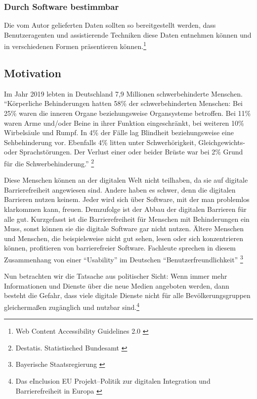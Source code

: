 \subsubsection{Durch Software bestimmbar}
Die vom Autor gelieferten Daten sollten so bereitgestellt werden, dass Benutzeragenten und assistierende Techniken diese Daten entnehmen können und in verschiedenen
Formen präsentieren können.\footnote{Web Content Accessibility Guidelines 2.0 \cite{WCAG2.0}}

\subsection{Motivation}
Im Jahr 2019 lebten in Deutschland 7,9 Millionen schwerbehinderte Menschen. "`Körperliche Behinderungen hatten 58\% der schwerbehinderten Menschen: Bei 25\% waren die inneren Organe beziehungsweise Organsysteme betroffen. Bei 11\% waren Arme und/oder Beine in ihrer Funktion eingeschränkt, bei weiteren 10\% Wirbelsäule und Rumpf. In 4\% der Fälle lag Blindheit beziehungsweise eine Sehbehinderung vor. Ebenfalls 4\% litten unter Schwerhörigkeit, Gleichgewichts- oder Sprachstörungen. Der Verlust einer oder beider Brüste war bei 2\% Grund für die Schwerbehinderung."' \footnote{Destatis. Statistisched Bundesamt \cite{DESTATIS}}

Diese Menschen können an der digitalen Welt nicht teilhaben, da sie auf digitale Barrierefreiheit angewiesen sind. Andere haben es schwer, denn die digitalen Barrieren nutzen keinem. Jeder wird sich über Software, mit der man problemlos klarkommen kann, freuen. Demzufolge ist der Abbau der digitalen Barrieren für alle gut. Kurzgefasst ist die Barrierefreiheit für Menschen mit Behinderungen ein Muss, sonst können sie die digitale Software gar nicht nutzen. Ältere Menschen und Menschen, die beispielsweise nicht gut sehen, lesen oder sich konzentrieren können, profitieren von barrierefreier Software. Fachleute sprechen in diesem Zusammenhang von einer "`Usability"' im Deutschen "`Benutzerfreundlichkeit"' \footnote{Bayerische Staatsregierung \cite{BS}}

Nun betrachten wir die Tatsache aus politischer Sicht: Wenn immer mehr Informationen und Dienste über die neue Medien angeboten werden, dann besteht die Gefahr, dass viele digitale Dienste nicht für alle Bevölkerungsgruppen gleichermaßen zugänglich und nutzbar sind.\footnote{Das eInclusion EU Projekt--Politik zur digitalen Integration und Barrierefreiheit in Europa \cite{redingeinclusion}}
